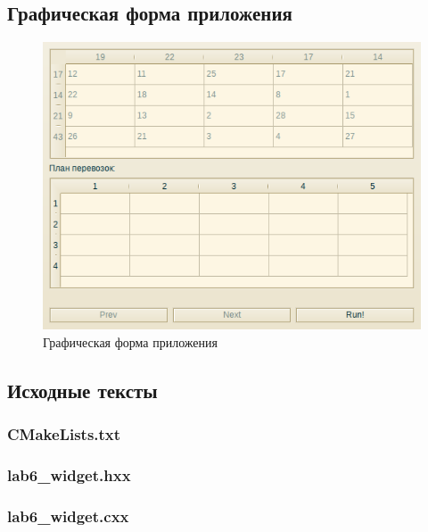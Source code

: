 \documentclass[a4paper,12pt,notitlepage,headsepline,pdftex]{scrartcl}
\begin{document}
  \subsection{Графическая форма приложения}
    \begin{figure}[h!]
      \begin{center}
        \includegraphics[width=\textwidth]{scr.png}
      \end{center}
      \caption{Графическая форма приложения}
      \label{fig:gui}
    \end{figure}
  \subsection{Исходные тексты}
    \subsubsection{CMakeLists.txt}
      
    \subsubsection{lab6\_widget.hxx}
      
    \subsubsection{lab6\_widget.cxx}
      
\end{document}
